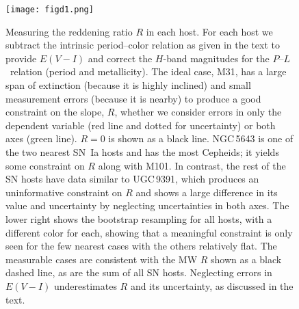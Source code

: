 \documentclass[12pt]{aastex631}
\newcommand{\PLs}{$P$--$L$\ }
\begin{document}
\begin{appendices}
\begin{figure}[b]   
\begin{center}
\texttt{[image: figd1.png]}
\end{center}
\caption{\label{fg:twodcolor} Measuring the reddening ratio $R$ in each host. For each host we subtract the intrinsic period--color relation as given in the text to provide $E(V\!-\!I)$ and correct the $H$-band magnitudes for the \PLs relation (period and metallicity).  The ideal case, M31, has a large span of extinction (because it is highly inclined) and small measurement errors (because it is nearby) to produce a good constraint on the slope, $R$, whether we consider errors in only the dependent variable (red line and dotted for uncertainty) or both axes (green line).  $R=0$ is shown as a black line.  NGC$\,$5643 is one of the two nearest SN~Ia hosts and has the most Cepheids; it yields some constraint on $R$ along with M101. In contrast, the rest of the SN hosts have data similar to UGC$\,$9391, which produces an uninformative constraint on $R$ and shows a large difference in its value and uncertainty by neglecting uncertainties in both axes.  The lower right shows the bootstrap resampling for all hosts, with a different color for each, showing that a meaningful constraint is only seen for the few nearest cases with the others relatively flat.  The measurable cases are consistent with the MW $R$ shown as a black dashed line, as are the sum of all SN hosts.  Neglecting errors in $E(V\!-\!I)$ underestimates $R$ and its uncertainty, as discussed in the text.}
\end{figure}
\end{appendices}

\clearpage 



\end{document}
